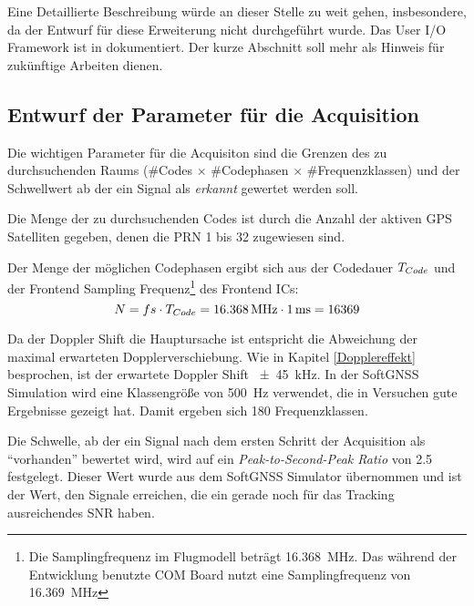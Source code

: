 Eine Detaillierte Beschreibung würde an dieser Stelle zu weit gehen, insbesondere, da der Entwurf für diese Erweiterung nicht durchgeführt wurde. Das User I/O Framework ist in \cite{uioHowto} dokumentiert. Der kurze Abschnitt soll mehr als Hinweis für zukünftige Arbeiten dienen.


\subsection{Entwurf der Parameter für die Acquisition}
Die wichtigen Parameter für die Acquisiton sind die Grenzen des zu durchsuchenden Raums (\#Codes $\times$ \#Codephasen $\times$ \#Frequenzklassen) und der Schwellwert ab der ein Signal als \emph{erkannt} gewertet werden soll.

Die Menge der zu durchsuchenden Codes ist durch die Anzahl der aktiven GPS Satelliten gegeben, denen die PRN 1 bis 32 zugewiesen sind. 

Der Menge der möglichen Codephasen ergibt sich aus der Codedauer ${T}_{Code}$ und der Frontend Sampling Frequenz\footnote{Die Samplingfrequenz im Flugmodell beträgt \SI{16.368}{\mega\hertz}. Das während der Entwicklung benutzte COM Board nutzt eine Samplingfrequenz von  \SI{16.369}{\mega\hertz}} des Frontend ICs:  
\begin{equation}
    N=fs\cdot {T}_{Code}=\SI{16.368}{\mega\hertz}\cdot \SI{1}{\milli\second} = 16369
\end{equation} 

Da der Doppler Shift die Hauptursache ist entspricht die Abweichung der maximal erwarteten Dopplerverschiebung. Wie in Kapitel \ref{Dopplereffekt} besprochen, ist der erwartete Doppler Shift \SI{\pm45}{\kilo\hertz}. In der SoftGNSS Simulation wird eine Klassengröße von \SI{500}{\Hz} verwendet, die in Versuchen gute Ergebnisse gezeigt hat. Damit ergeben sich 180 Frequenzklassen.

Die Schwelle, ab der ein Signal nach dem ersten Schritt der Acquisition als \enquote{vorhanden} bewertet wird, wird auf ein \emph{Peak-to-Second-Peak Ratio} von \num{2.5} festgelegt. Dieser Wert wurde aus dem SoftGNSS Simulator übernommen und ist der Wert, den Signale erreichen, die ein gerade noch für das Tracking ausreichendes SNR haben.

